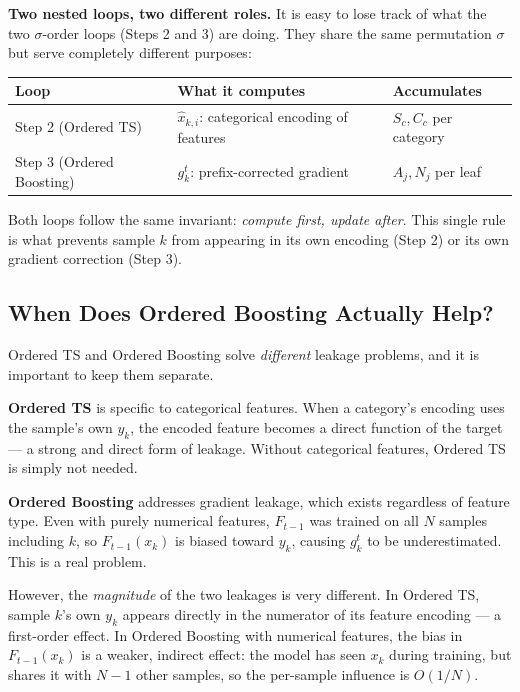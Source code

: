 \documentclass[11pt, a4paper]{article}
\begin{document}
\textbf{Two nested loops, two different roles.}
It is easy to lose track of what the two $\sigma$-order loops (Steps 2 and 3)
are doing. They share the same permutation $\sigma$ but serve completely
different purposes:

\begin{center}
\begin{tabular}{lll}
\toprule
\textbf{Loop} & \textbf{What it computes} & \textbf{Accumulates} \\
\midrule
Step 2 (Ordered TS) & $\hat{x}_{k,i}$: categorical encoding of features & $S_c, C_c$ per category \\
Step 3 (Ordered Boosting) & $g_k^t$: prefix-corrected gradient & $A_j, N_j$ per leaf \\
\bottomrule
\end{tabular}
\end{center}

Both loops follow the same invariant: \emph{compute first, update after}.
This single rule is what prevents sample $k$ from appearing in its own
encoding (Step 2) or its own gradient correction (Step 3).

\subsection{When Does Ordered Boosting Actually Help?}
\label{sec:ordered_practical}

Ordered TS and Ordered Boosting solve \emph{different} leakage problems,
and it is important to keep them separate.

\textbf{Ordered TS} is specific to categorical features.
When a category's encoding uses the sample's own $y_k$, the encoded feature
becomes a direct function of the target --- a strong and direct form of leakage.
Without categorical features, Ordered TS is simply not needed.

\textbf{Ordered Boosting} addresses gradient leakage, which exists regardless
of feature type. Even with purely numerical features, $F_{t-1}$ was trained
on all $N$ samples including $k$, so $F_{t-1}(x_k)$ is biased toward $y_k$,
causing $g_k^t$ to be underestimated. This is a real problem.

However, the \emph{magnitude} of the two leakages is very different.
In Ordered TS, sample $k$'s own $y_k$ appears directly in the numerator
of its feature encoding --- a first-order effect.
In Ordered Boosting with numerical features, the bias in $F_{t-1}(x_k)$
is a weaker, indirect effect: the model has seen $x_k$ during training,
but shares it with $N-1$ other samples, so the per-sample influence is
$O(1/N)$.
\end{document}
